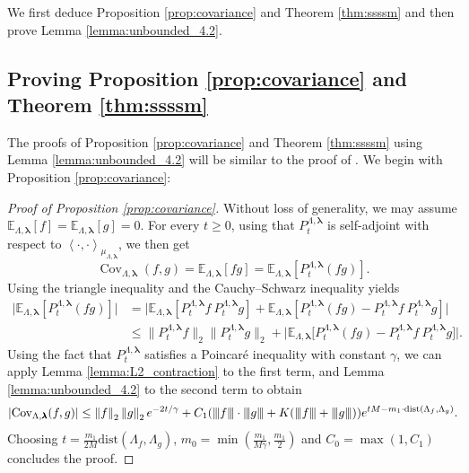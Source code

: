 \documentclass[10pt]{amsart}
\theoremstyle{definition}
\theoremstyle{remark}
\newcommand{\innerProduct}[2]{\left\langle #1, #2 \right\rangle}
\newcommand{\tnorm}[1]{{\left\vert\kern-0.25ex\left\vert\kern-0.25ex\left\vert #1 
		\right\vert\kern-0.25ex\right\vert\kern-0.25ex\right\vert}}
\newcommand{\dist}{\mathrm{dist}}
\newcommand{\E}{\mathbb{E}}
\newcommand{\region}{\Lambda}
\newcommand{\activities}{\pmb{\lambda}}
\newcommand{\norm}[1]{\left\lVert#1\right\rVert}
\newcommand{\absolute}[1]{\left\lvert#1\right\rvert}
\newcommand{\Cov}{\operatorname{Cov}}
\begin{document}
	We first deduce Proposition \ref{prop:covariance} and Theorem \ref{thm:ssssm} and then prove Lemma \ref{lemma:unbounded_4.2}.
	
	\newcommand{\infnorm}[1]
	{\big\| #1 \big\|_\infty}
	\newcommand{\twonorm}[1]
	{\big\| #1 \big\|_2}
	
	\subsection{Proving Proposition \texorpdfstring{\ref{prop:covariance}}{3.3} and Theorem  \texorpdfstring{\ref{thm:ssssm}}{3.1}}
	
	
	The proofs of Proposition \ref{prop:covariance} and Theorem \ref{thm:ssssm} using Lemma \ref{lemma:unbounded_4.2} will be similar to the proof of \cite[Theorem 4.1]{bertini2002spectral}.  We begin with Proposition \ref{prop:covariance}:
	
	\begin{proof}[Proof of Proposition \ref{prop:covariance}]
		Without loss of generality, we may assume $\E_{\region, \activities}[f] = \E_{\region, \activities}[g] = 0$.
		For every $t \ge 0$, using that $P_t^{\region, \activities}$ is self-adjoint with respect to $\innerProduct{\cdot}{\cdot}_{\mu_{\region, \activities}}$, we then get
		\[
		\Cov_{\region, \activities}(f, g) = \E_{\region, \activities}[f  g] =  \E_{\region, \activities}[P_t^{\region, \activities} (f g)] .
		\]
		Using the triangle inequality and the Cauchy--Schwarz inequality yields
		\begin{align*}
			\big| \E_{\region, \activities}[P_t^{\region, \activities} (f g)] \big| &= \big| \E_{\region, \activities}[P_t^{\region, \activities} f \ P_t^{\region, \activities} g] + \E_{\region, \activities}[P_t^{\region, \activities} (f g) - P_t^{\region, \activities} f \ P_t^{\region, \activities} g] \big|\\
			&\le \twonorm{ P_t^{\region, \activities} f} \twonorm{ P_t^{\region, \activities} g} + \big| \E_{\region, \activities}\big[P_t^{\region, \activities} (f g) - P_t^{\region, \activities} f \  P_t^{\region, \activities} g\big] \big|.
		\end{align*}
		Using the fact that $P_t^{\region, \activities}$ satisfies a Poincar\'e inequality with constant $\gamma$, we can apply Lemma \ref{lemma:L2_contraction} to the first term, and Lemma \ref{lemma:unbounded_4.2} to the second term to obtain
		\[
		\absolute{\Cov_{\region, \activities}(f, g)}
		\le \norm{f}_2 \norm{g}_2  e^{-2 t/\gamma} + C_1  (\tnorm{f} \cdot \tnorm{g} + K  (\tnorm{f} + \tnorm{g}))  e^{t  M - m_1  \cdot\dist(\region_f, \region_g)}.
		\]
		Choosing $t = \frac{m_1}{2M}  \dist(\region_f, \region_g)$, $m_0 = \min(\frac{m_1}{M \gamma}, \frac{m_1}{2})$ and $C_0 = \max(1, C_1)$ concludes the proof.
	\end{proof}
	
\end{document}
